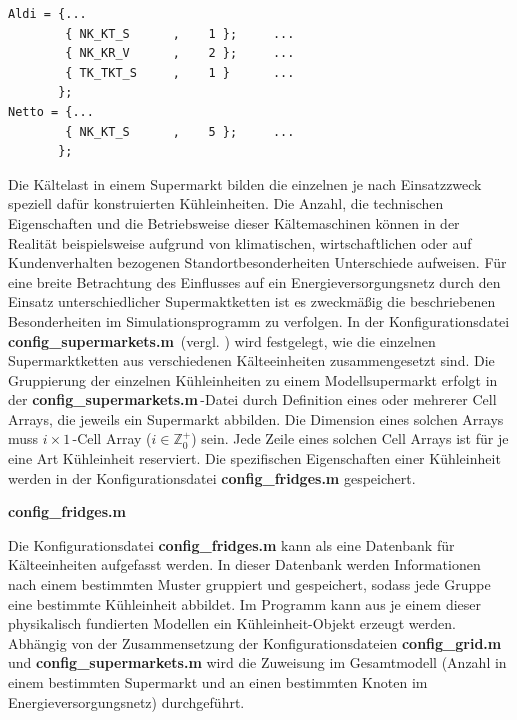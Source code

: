 \begin{lstlisting}[float=h!,caption=config\_supermarkets.m,label={csuper}]
%%       Kind of fridge     Anzahl
Aldi = {...
        { NK_KT_S      ,    1 };     ...
        { NK_KR_V      ,    2 };     ...
        { TK_TKT_S     ,    1 }      ...
       };
Netto = {...
        { NK_KT_S      ,    5 };     ...
       };
\end{lstlisting}

Die Kältelast in einem Supermarkt bilden die einzelnen je nach Einsatzzweck
speziell dafür konstruierten Kühleinheiten. Die Anzahl, die technischen
Eigenschaften und die Betriebsweise dieser Kältemaschinen können in der Realität
beispielsweise aufgrund von klimatischen, wirtschaftlichen oder auf
Kundenverhalten bezogenen Standortbesonderheiten Unterschiede
aufweisen. Für eine breite Betrachtung des
Einflusses auf ein Energieversorgungsnetz durch den Einsatz unterschiedlicher
Supermaktketten ist es zweckmäßig die beschriebenen Besonderheiten im
Simulationsprogramm zu verfolgen. In der Konfigurationsdatei
\textbf{config\_supermarkets.m$\,$} (vergl. ) wird festgelegt,
wie die einzelnen Supermarktketten aus verschiedenen Kälteeinheiten
zusammengesetzt sind. Die Gruppierung der einzelnen Kühleinheiten zu einem
Modellsupermarkt erfolgt in der \textbf{config\_supermarkets.m$\,$}-Datei durch
Definition eines oder mehrerer Cell Arrays, die jeweils ein Supermarkt abbilden.
Die Dimension eines solchen Arrays muss $i\times1\,$-Cell Array ($i\in
\mathbb{Z}^+_0$) sein. Jede Zeile eines solchen Cell Arrays ist für je eine
Art Kühleinheit reserviert. Die spezifischen Eigenschaften einer Kühleinheit
werden in der Konfigurationsdatei \textbf{config\_fridges.m} gespeichert.

\vspace{3mm}%
\noindent\textbf{config\_fridges.m}
\vspace{3mm}

Die Konfigurationsdatei \textbf{config\_fridges.m} kann als eine Datenbank für
Kälteeinheiten aufgefasst werden. In dieser Datenbank werden Informationen nach
einem bestimmten Muster gruppiert und gespeichert, sodass jede Gruppe eine
bestimmte Kühleinheit abbildet. Im Programm kann aus
je einem dieser physikalisch fundierten Modellen ein Kühleinheit-Objekt
erzeugt werden. Abhängig von der Zusammensetzung der Konfigurationsdateien
\textbf{config\_grid.m} und \textbf{config\_supermarkets.m} wird die Zuweisung
im Gesamtmodell (Anzahl in einem bestimmten Supermarkt und an einen bestimmten
Knoten im Energieversorgungsnetz) durchgeführt.

